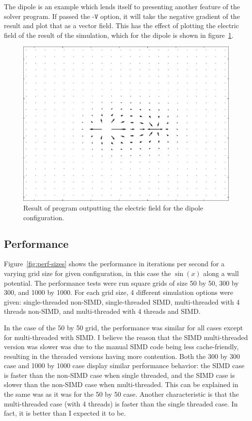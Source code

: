 The dipole is an example which lends itself to presenting another feature of the solver program. If passed the
$\texttt{-V}$ option, it will take the negative gradient of the result and plot that as a vector field. This has
the effect of plotting the electric field of the result of the simulation, which for the dipole is shown in
figure~\ref{fig:dipole-field}.

	\begin{figure}[h]
	\centering
	\includegraphics[width=0.7\linewidth]{dipole_field.pdf}
	\caption{Result of program outputting the electric field for the dipole configuration.} \label{fig:dipole-field}
	\end{figure}


\subsection{Performance}


Figure~\ref{fig:perf-sizes} shows the performance in iterations per second for a varying grid size for given
configuration, in this case the $\sin(x)$ along a wall potential. The performance tests were run square grids
of size 50 by 50, 300 by 300, and 1000 by 1000. For each grid size, 4 different simulation options were given:
single-threaded non-SIMD, single-threaded SIMD, multi-threaded with 4 threads non-SIMD, and multi-threaded
with 4 threads and SIMD.

In the case of the 50 by 50 grid, the performance was similar for all cases
except for multi-threaded with SIMD. I believe the reason that the SIMD multi-threaded version was slower was
due to the manual SIMD code being less cache-friendly, resulting in the threaded versions having more contention.
Both the 300 by 300 case and 1000 by 1000 case display similar performance behavior: the SIMD case is faster than
the non-SIMD case when single threaded, and the SIMD case is slower than the non-SIMD case when multi-threaded.
This can be explained in the same was as it was for the 50 by 50 case. Another characteristic is that the multi-threaded
case (with 4 threads) is faster than the single threaded case. In fact, it is better than I expected it to be.

